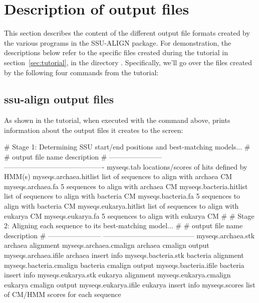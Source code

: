 \section{Description of output files}
\label{sec:output}

This section describes the content of the different output file
formats created by the various programs in the SSU-ALIGN
package. For demonstration, the descriptions below refer to the
specific files created during the tutorial in
section~\ref{sec:tutorial}, in the directory . 
Specifically, we'll go over the files created by the following four
commands from the tutorial:




\subsection{ssu-align output files}

As shown in the tutorial, when executed with the command above,  
prints information about the output files it creates to the screen:

\begin{sreoutput}
# Stage 1: Determining SSU start/end positions and best-matching models...
#
# output file name         description                                
# -----------------------  -------------------------------------------
  myseqs.tab               locations/scores of hits defined by HMM(s)
  myseqs.archaea.hitlist   list of sequences to align with archaea CM
  myseqs.archaea.fa              5 sequences to align with archaea CM
  myseqs.bacteria.hitlist  list of sequences to align with bacteria CM
  myseqs.bacteria.fa             5 sequences to align with bacteria CM
  myseqs.eukarya.hitlist   list of sequences to align with eukarya CM
  myseqs.eukarya.fa              5 sequences to align with eukarya CM
#
# Stage 2: Aligning each sequence to its best-matching model...
#
# output file name         description
# -----------------------  ---------------------------------------
  myseqs.archaea.stk       archaea alignment
  myseqs.archaea.cmalign   archaea cmalign output
  myseqs.archaea.ifile     archaea insert info
  myseqs.bacteria.stk      bacteria alignment
  myseqs.bacteria.cmalign  bacteria cmalign output
  myseqs.bacteria.ifile    bacteria insert info
  myseqs.eukarya.stk       eukarya alignment
  myseqs.eukarya.cmalign   eukarya cmalign output
  myseqs.eukarya.ifile     eukarya insert info
  myseqs.scores            list of CM/HMM scores for each sequence
\end{sreoutput}

